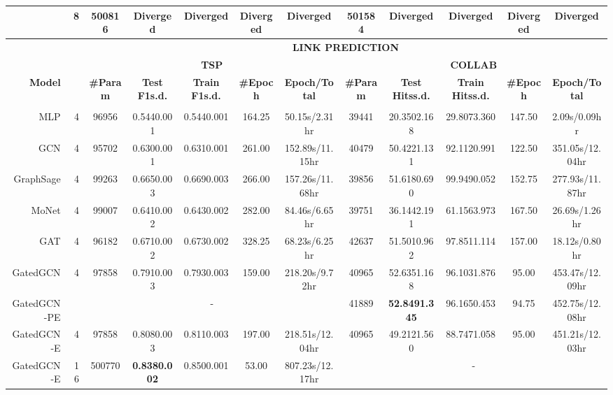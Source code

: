 \documentclass{article}
\newcommand{\best}[1]{{\color{red}\textbf{#1}}}
\newcommand{\good}[1]{{\color{violet}#1}}
\begin{document}
\begin{table}[t!]
{\begin{tabular}{rr|ccccc|ccccc}
        & 8 & 500816 & Diverged & Diverged & Diverged & Diverged & 501584 & Diverged & Diverged & Diverged & Diverged \\
        \midrule
        \midrule
        & & \multicolumn{10}{c}{\textbf{LINK PREDICTION}} \\
        & & \multicolumn{5}{c}{\textbf{TSP}} & \multicolumn{5}{c}{\textbf{COLLAB}}\\
        \multirow{2}{*}{\textbf{Model}} & \multirow{2}{*}{\textbf{}} & \multirow{2}{*}{\textbf{\#Param}} & \multirow{2}{*}{\textbf{Test F1s.d.}} & \multirow{2}{*}{\textbf{Train F1s.d.}} & \multirow{2}{*}{\textbf{\#Epoch}} & \multirow{2}{*}{\textbf{Epoch/Total}} & \textbf{\#Param} & \multirow{2}{*}{\textbf{Test Hitss.d.}} & \multirow{2}{*}{\textbf{Train Hitss.d.}} & \multirow{2}{*}{\textbf{\#Epoch}} & \multirow{2}{*}{\textbf{Epoch/Total}} \\
         & & & & & & &  & & & & \\
        \midrule
        \midrule
        MLP & 4 & 96956 & 0.5440.001 & 0.5440.001 & 164.25 & 50.15s/2.31hr & 39441 & 20.3502.168 & 29.8073.360 & 147.50 & 2.09s/0.09hr \\
        \midrule
        GCN & 4 & 95702 & 0.6300.001 & 0.6310.001 & 261.00 & 152.89s/11.15hr & 40479 & 50.4221.131 & 92.1120.991 & 122.50 & 351.05s/12.04hr \\
        GraphSage & 4 & 99263 & 0.6650.003 & 0.6690.003 & 266.00 & 157.26s/11.68hr & 39856 & \good{51.6180.690} & 99.9490.052 & 152.75 & 277.93s/11.87hr \\
        \midrule
MoNet & 4 & 99007 & 0.6410.002 & 0.6430.002 & 282.00 & 84.46s/6.65hr & 39751 & 36.1442.191 & 61.1563.973 & 167.50 & 26.69s/1.26hr \\
        GAT & 4 & 96182 & 0.6710.002 & 0.6730.002 & 328.25 & 68.23s/6.25hr & 42637 & \good{51.5010.962} & 97.8511.114 & 157.00 & 18.12s/0.80hr \\
        GatedGCN & 4 & 97858 & \good{0.7910.003} & 0.7930.003 & 159.00 & 218.20s/9.72hr & 40965 & \good{52.6351.168} & 96.1031.876 & 95.00 & 453.47s/12.09hr \\
        GatedGCN-PE & & \multicolumn{5}{c|}{-} & 41889 & \best{52.8491.345} & 96.1650.453 & 94.75 & 452.75s/12.08hr \\
        GatedGCN-E & 4 & 97858 & \good{0.8080.003} & 0.8110.003 & 197.00 & 218.51s/12.04hr & 40965 & 49.2121.560 & 88.7471.058 & 95.00 & 451.21s/12.03hr \\
        GatedGCN-E & 16 & 500770 & \best{0.8380.002} & 0.8500.001 & 53.00 & 807.23s/12.17hr & \multicolumn{5}{c}{-} \\

\end{tabular}}
\end{table}
\end{document}
